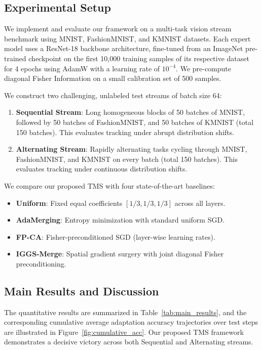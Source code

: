 \documentclass{article}
\theoremstyle{plain}
\theoremstyle{definition}
\theoremstyle{remark}
\begin{document}
\subsection{Experimental Setup}
We implement and evaluate our framework on a multi-task vision stream benchmark using MNIST, FashionMNIST, and KMNIST datasets. Each expert model uses a ResNet-18 backbone architecture, fine-tuned from an ImageNet pre-trained checkpoint on the first 10,000 training samples of its respective dataset for 4 epochs using AdamW with a learning rate of $10^{-4}$. We pre-compute diagonal Fisher Information on a small calibration set of 500 samples.

We construct two challenging, unlabeled test streams of batch size 64:
\begin{enumerate}
    \item \textbf{Sequential Stream}: Long homogeneous blocks of 50 batches of MNIST, followed by 50 batches of FashionMNIST, and 50 batches of KMNIST (total 150 batches). This evaluates tracking under abrupt distribution shifts.
    \item \textbf{Alternating Stream}: Rapidly alternating tasks cycling through MNIST, FashionMNIST, and KMNIST on every batch (total 150 batches). This evaluates tracking under continuous distribution shifts.
\end{enumerate}

We compare our proposed TMS with four state-of-the-art baselines:
\begin{itemize}
    \item \textbf{Uniform}: Fixed equal coefficients $[1/3, 1/3, 1/3]$ across all layers.
    \item \textbf{AdaMerging}: Entropy minimization with standard uniform SGD.
    \item \textbf{FP-CA}: Fisher-preconditioned SGD (layer-wise learning rates).
    \item \textbf{IGGS-Merge}: Spatial gradient surgery with joint diagonal Fisher preconditioning.
\end{itemize}

\subsection{Main Results and Discussion}
The quantitative results are summarized in Table~\ref{tab:main_results}, and the corresponding cumulative average adaptation accuracy trajectories over test steps are illustrated in Figure~\ref{fig:cumulative_acc}. Our proposed TMS framework demonstrates a decisive victory across both Sequential and Alternating streams.
\end{document}
